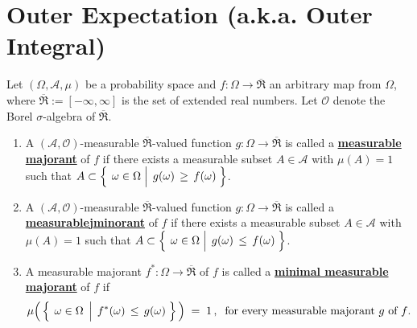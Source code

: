 

\section{Outer Expectation (a.k.a. Outer Integral)}
\setcounter{theorem}{0}
\setcounter{equation}{0}


\renewcommand{\theenumi}{\roman{enumi}}
\renewcommand{\labelenumi}{\textnormal{(\theenumi)}$\;\;$}


\begin{definition}
\label{defn:MajorantsOuterExpectation}
\mbox{}\vskip 0.1cm
\noindent
Let $(\Omega,\mathcal{A},\mu)$ be a probability space and
$f : \Omega \longrightarrow \overline{\Re}$
an arbitrary map from $\Omega$, where $\overline{\Re} := [-\infty,\infty]$ is the set of extended real numbers.
Let $\mathcal{O}$ denote the Borel $\sigma$-algebra of $\overline{\Re}$.
\begin{enumerate}
\item
	A $(\mathcal{A},\mathcal{O})$-measurable $\overline{\Re}$-valued function
	$g : \Omega\longrightarrow\overline{\Re}$
	is called a \underline{\textbf{measurable majorant}} of $f$ if there exists a measurable
	subset $A \in \mathcal{A}$ with $\mu(A) = 1$ such that
	$A \subset \left\{\;\left.\omega\overset{{\color{white}.}}{\in}\Omega\;\right\vert\; g(\omega) \,\geq\, f(\omega)\;\right\}$.
\item
	A $(\mathcal{A},\mathcal{O})$-measurable $\overline{\Re}$-valued function
	$g : \Omega\longrightarrow\overline{\Re}$
	is called a \underline{\textbf{measurable{\color{white}j}minorant}} of $f$ if there exists a measurable
	subset $A \in \mathcal{A}$ with $\mu(A) = 1$ such that
	$A \subset \left\{\;\left.\omega\overset{{\color{white}.}}{\in}\Omega\;\right\vert\; g(\omega) \,\leq\, f(\omega)\;\right\}$.
\item
	A measurable majorant $f^{*}:\Omega\longrightarrow\overline{\Re}$ of $f$
	is called a \underline{\textbf{minimal measurable majorant}} of $f$ if
	\begin{equation*}
	\mu\!\left(\,
		\left\{\;\left.\omega\overset{{\color{white}.}}{\in}\Omega\;\,\right\vert\; f^{*}(\omega) \,\leq\, g(\omega)\;\right\}
		\,\right)
	\;=\;1\,,\;\;
	\textnormal{for every measurable majorant $g$ of $f$}.

\end{equation*}
\end{enumerate}
\end{definition}
